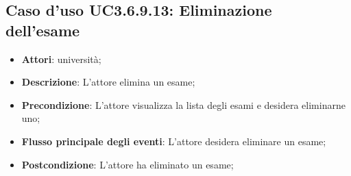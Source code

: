 \subsection{Caso d'uso \texorpdfstring{UC3.6.9.13}{UC3.6.9.13}: Eliminazione dell’esame}
\begin{itemize}
\item \textbf{Attori}: università;
\item \textbf{Descrizione}: L'attore elimina un esame;

\item \textbf{Precondizione}: L'attore visualizza la lista degli esami e desidera eliminarne uno;

\item \textbf{Flusso principale degli eventi}: L'attore desidera eliminare un esame;

\item \textbf{Postcondizione}: L'attore ha eliminato un esame;

\end{itemize}
